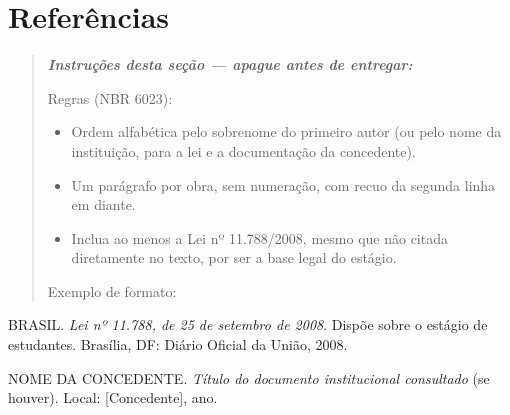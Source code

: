 \documentclass[article,12pt,a4paper,oneside]{abntex2}
\newenvironment{instrucoes}{%
  \begin{quotation}\footnotesize\itshape
  \noindent\textbf{\upshape Instruções desta seção — apague antes de entregar:}\par\smallskip
}{%
  \end{quotation}
}
\begin{document}
\section*{Referências}

\begin{instrucoes}
Regras (NBR 6023):
\begin{itemize}
  \item Ordem alfabética pelo sobrenome do primeiro autor (ou pelo nome da instituição, para a lei e a documentação da concedente).
  \item Um parágrafo por obra, sem numeração, com recuo da segunda linha em diante.
  \item Inclua ao menos a Lei nº 11.788/2008, mesmo que não citada diretamente no texto, por ser a base legal do estágio.
\end{itemize}
Exemplo de formato:
\end{instrucoes}

\newcommand{\referencia}[1]{\par\noindent\hangindent=1cm #1\par\medskip}

\referencia{BRASIL. \textit{Lei nº 11.788, de 25 de setembro de 2008}.
Dispõe sobre o estágio de estudantes. Brasília, DF: Diário Oficial da
União, 2008.}

\referencia{NOME DA CONCEDENTE. \textit{Título do documento institucional
consultado} (se houver). Local: [Concedente], ano.}
\end{document}
